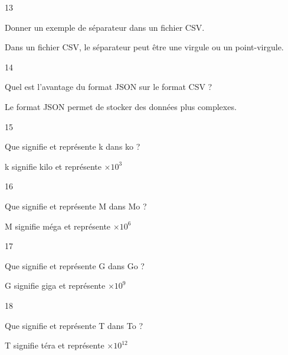 \begin{taggedblock}{13}
\begin{exoq}
Donner un exemple de séparateur dans un fichier CSV.
\end{exoq} 
\begin{exor}
Dans un fichier CSV, le séparateur peut être une virgule ou un point-virgule. \bqr
\end{exor} 
\end{taggedblock}

\begin{taggedblock}{14}
\begin{exoq}
Quel est l'avantage du format JSON sur le format CSV ?
\end{exoq} 
\begin{exor}
Le format JSON permet de stocker des données plus complexes. \bqr
\end{exor} 
\end{taggedblock}

\begin{taggedblock}{15}
\begin{exoq}
Que signifie et représente k dans ko ?
\end{exoq} 
\begin{exor}
k signifie kilo et représente $ \times 10^{3} $ \bqr
\end{exor} 
\end{taggedblock}

\begin{taggedblock}{16}
\begin{exoq}
Que signifie et représente M dans Mo ?
\end{exoq} 
\begin{exor}
M signifie méga et représente $ \times 10^{6} $ \bqr
\end{exor} 
\end{taggedblock}

\begin{taggedblock}{17}
\begin{exoq}
Que signifie et représente G dans Go ?
\end{exoq} 
\begin{exor}
G signifie giga et représente $ \times 10^{9} $ \bqr
\end{exor} 
\end{taggedblock}

\begin{taggedblock}{18}
\begin{exoq}
Que signifie et représente T dans To ?
\end{exoq} 
\begin{exor}
T signifie téra et représente $ \times 10^{12} $ \bqr
\end{exor} 
\end{taggedblock}

